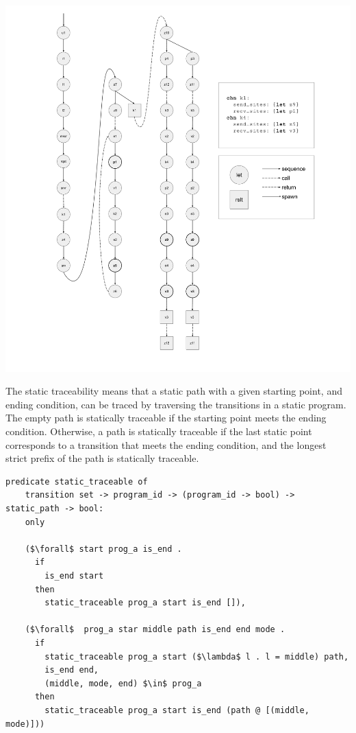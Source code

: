 \documentclass{article}
\begin{document}
\includegraphics[width=1.3\textwidth, left]{cml_graph.pdf}

The static traceability means that a static path with a given starting point, and ending
condition, can be traced by traversing the transitions in a static program.
The empty path is statically traceable if the starting point meets the ending condition.
Otherwise, a path is statically traceable if the last static point corresponds to a transition
that meets the ending condition, and the longest strict prefix of the path is statically
traceable.  

\begin{lstlisting}[language=logic, mathescape]
  predicate static_traceable of
    transition set -> program_id -> (program_id -> bool) -> static_path -> bool:
    only

    ($\forall$ start prog_a is_end .
      if
        is_end start
      then
        static_traceable prog_a start is_end []),

    ($\forall$  prog_a star middle path is_end end mode .
      if 
        static_traceable prog_a start ($\lambda$ l . l = middle) path, 
        is_end end, 
        (middle, mode, end) $\in$ prog_a 
      then
        static_traceable prog_a start is_end (path @ [(middle, mode)]))
  \end{lstlisting}
\end{document}
